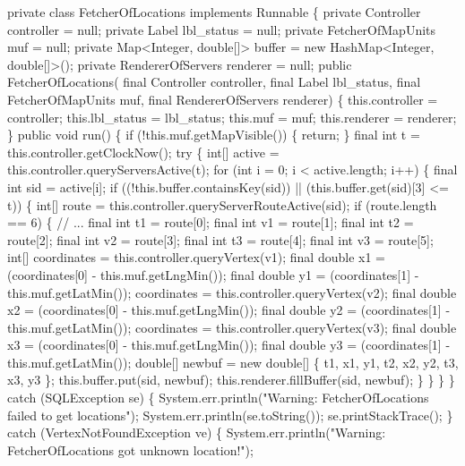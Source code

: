 \nwenddocs{}\plusendmoddef
private class FetcherOfLocations implements Runnable \{
  private Controller controller = null;
  private Label lbl_status = null;
  private FetcherOfMapUnits muf = null;
  private Map<Integer, double[]> buffer = new HashMap<Integer, double[]>();
  private RendererOfServers renderer = null;
  public FetcherOfLocations(
      final Controller controller,
      final Label lbl_status,
      final FetcherOfMapUnits muf,
      final RendererOfServers renderer) \{
    this.controller = controller;
    this.lbl_status = lbl_status;
    this.muf = muf;
    this.renderer = renderer;
  \}
  public void run() \{
    if (!this.muf.getMapVisible()) \{
      return;
    \}
    final int t = this.controller.getClockNow();
    try \{
      int[] active = this.controller.queryServersActive(t);
      for (int i = 0; i < active.length; i++) \{
        final int sid = active[i];
        if ((!this.buffer.containsKey(sid)) || (this.buffer.get(sid)[3] <= t)) \{
          int[] route = this.controller.queryServerRouteActive(sid);
          if (route.length == 6) \{  // ...
            final int t1 = route[0];
            final int v1 = route[1];
            final int t2 = route[2];
            final int v2 = route[3];
            final int t3 = route[4];
            final int v3 = route[5];
            int[] coordinates = this.controller.queryVertex(v1);
            final double x1 = (coordinates[0] - this.muf.getLngMin());
            final double y1 = (coordinates[1] - this.muf.getLatMin());
            coordinates = this.controller.queryVertex(v2);
            final double x2 = (coordinates[0] - this.muf.getLngMin());
            final double y2 = (coordinates[1] - this.muf.getLatMin());
            coordinates = this.controller.queryVertex(v3);
            final double x3 = (coordinates[0] - this.muf.getLngMin());
            final double y3 = (coordinates[1] - this.muf.getLatMin());
            double[] newbuf = new double[] \{ t1, x1, y1, t2, x2, y2, t3, x3, y3 \};
            this.buffer.put(sid, newbuf);
            this.renderer.fillBuffer(sid, newbuf);
          \}
        \}
      \}
    \} catch (SQLException se) \{
      System.err.println("Warning: FetcherOfLocations failed to get locations");
      System.err.println(se.toString());
      se.printStackTrace();
    \} catch (VertexNotFoundException ve) \{
      System.err.println("Warning: FetcherOfLocations got unknown location!");

